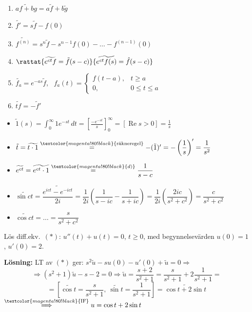 \begin{theorem}
\begin{enumerate}[label=\textcircled{\alph*}]
  \item $\widetilde{af + bg} = a\tilde{f} + b\tilde{g}$
  \item $\widetilde{f'} = s\tilde{f} - f(0)$
  \item $\widetilde{f^{(n)}} = s^n\tilde{f} - s^{n-1}f(0) - \dots - f^{(n-1)}(0)$
  \item $\rattat{\widetilde{e^{ct}f} = \tilde{f}(s - c)}{\widetilde{e^{ct}f(s)} = \hat{f}(s - c)}$
  \item $\widetilde{f_a} = e^{-as}\tilde{f}$, \ $f_a(t) = \begin{cases} f(t - a), & t \ge a \\ 0, & 0 \le t \le a \end{cases}$
  \item $\widetilde{tf} = -\tilde{f}'$
\end{enumerate}
\end{theorem}

\begin{example}
\begin{itemize}
  \item $\tilde{1}(s) = \displaystyle\int_0^\infty 1e^{-st}\,dt = \left[ \frac{-e^{-st}}{s} \right]_0^\infty = [\operatorname{Re} s > 0] = \frac{1}{s}$
  \item $\tilde{t} = \widetilde{t \cdot 1} \overset{\textcolor{magenta!80!black}{\text{räkneregel}}}{=} -(\tilde{1})' = -\left( \dfrac{1}{s} \right)' = \dfrac{1}{s^2}$
  \item $\widetilde{e^{ct}} = \widetilde{e^{ct} \cdot 1} \overset{\textcolor{magenta!80!black}{d)}}{=} \dfrac{1}{s - c}$
  \item $\widetilde{\sin ct} = \widetilde{\dfrac{e^{ict} - e^{-ict}}{2i}} = \dfrac{1}{2i}\left( \dfrac{1}{s - ic} - \dfrac{1}{s + ic} \right) = \dfrac{1}{2i}\left( \dfrac{2ic}{s^2 + c^2} \right) = \dfrac{c}{s^2 + c^2}$
  \item $\widetilde{\cos ct} = \dots = \dfrac{s}{s^2 + c^2}$
\end{itemize}
\end{example}

\begin{example}
Lös diff.ekv.\ $(*)$: $u''(t) + u(t) = 0$, $t \ge 0$, med begynnelsevärden $u(0) = 1$, $u'(0) = 2$.

\textbf{Lösning:} LT av $(*)$ ger: $s^2\tilde{u} - su(0) - u'(0) + \tilde{u} = 0 \Rightarrow$
\[ \Rightarrow (s^2 + 1)\tilde{u} - s - 2 = 0 \Longrightarrow \tilde{u} = \frac{s + 2}{s^2 + 1} = \frac{s}{s^2 + 1} + 2\frac{1}{s^2 + 1} = \]
\[ = \left[ \widetilde{\cos t} = \frac{s}{s^2 + 1},\ \widetilde{\sin t} = \frac{1}{s^2 + 1} \right] = \widetilde{\cos t + 2\sin t} \]
$\overset{\textcolor{magenta!80!black}{\text{IF}}}{\Longrightarrow} u = \cos t + 2\sin t$
\end{example}
